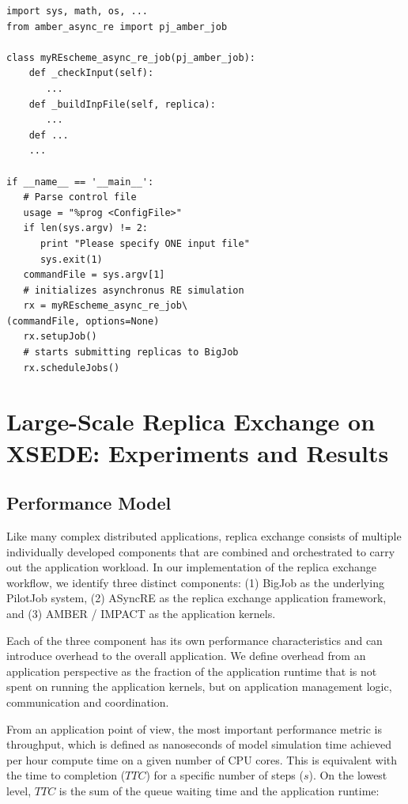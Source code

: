 \documentclass{sig-alternate}
\begin{document}
\begin{lstlisting}[frame=single]
import sys, math, os, ...
from amber_async_re import pj_amber_job

class myREscheme_async_re_job(pj_amber_job):
    def _checkInput(self):
       ...
    def _buildInpFile(self, replica):
       ...
    def ...
    ...

if __name__ == '__main__':
   # Parse control file
   usage = "%prog <ConfigFile>"
   if len(sys.argv) != 2:
      print "Please specify ONE input file"
      sys.exit(1)    
   commandFile = sys.argv[1]
   # initializes asynchronus RE simulation
   rx = myREscheme_async_re_job\
(commandFile, options=None)
   rx.setupJob()
   # starts submitting replicas to BigJob
   rx.scheduleJobs()
\end{lstlisting}

\section{Large-Scale Replica Exchange on XSEDE: Experiments and
  Results}\label{sec:results}

\subsection{Performance Model}

Like many complex distributed applications, replica exchange consists of
multiple individually developed components that are combined and orchestrated to
carry out the application workload. In our implementation of the replica
exchange workflow, we identify three distinct  components: (1) BigJob as the
underlying PilotJob system, (2) ASyncRE as  the replica exchange application
framework, and (3) AMBER / IMPACT as the  application kernels.

Each of the three component has its own performance characteristics and 
can introduce overhead to the overall application. We define overhead from an 
application perspective as the fraction of the application runtime that is 
not spent on running the application kernels, but on application management 
logic, communication and coordination.

From an application point of view, the most important performance metric 
is throughput, which is defined as nanoseconds of model simulation time 
achieved per hour compute time on a given number of CPU cores. This is 
equivalent with the time to completion ($TTC$) for a specific number of 
steps ($s$). On the lowest level, $TTC$ is the sum of the queue waiting time and 
the application runtime:
\end{document}
